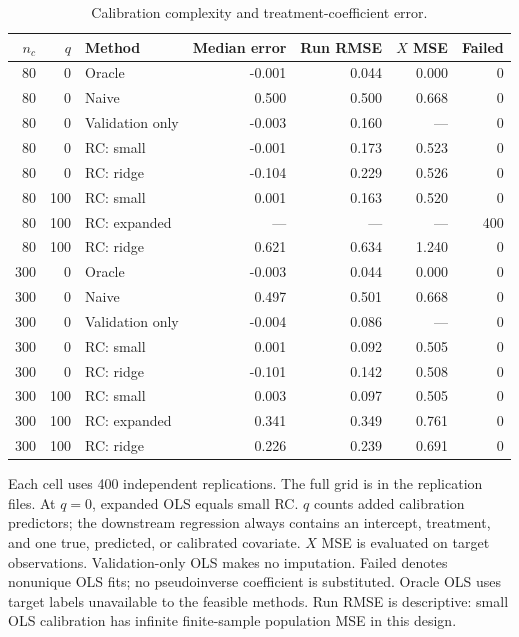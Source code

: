 \begin{table}[htbp]\centering\small
\caption{Calibration complexity and treatment-coefficient error.}
\label{tab:dimension}
\begin{tabular}{rrlrrrr}\toprule
$n_c$ & $q$ & Method & Median error & Run RMSE & $X$ MSE & Failed \\\midrule
80 & 0 & Oracle & -0.001 & 0.044 & 0.000 & 0 \\
80 & 0 & Naive & 0.500 & 0.500 & 0.668 & 0 \\
80 & 0 & Validation only & -0.003 & 0.160 & --- & 0 \\
80 & 0 & RC: small & -0.001 & 0.173 & 0.523 & 0 \\
80 & 0 & RC: ridge & -0.104 & 0.229 & 0.526 & 0 \\
80 & 100 & RC: small & 0.001 & 0.163 & 0.520 & 0 \\
80 & 100 & RC: expanded & --- & --- & --- & 400 \\
80 & 100 & RC: ridge & 0.621 & 0.634 & 1.240 & 0 \\
300 & 0 & Oracle & -0.003 & 0.044 & 0.000 & 0 \\
300 & 0 & Naive & 0.497 & 0.501 & 0.668 & 0 \\
300 & 0 & Validation only & -0.004 & 0.086 & --- & 0 \\
300 & 0 & RC: small & 0.001 & 0.092 & 0.505 & 0 \\
300 & 0 & RC: ridge & -0.101 & 0.142 & 0.508 & 0 \\
300 & 100 & RC: small & 0.003 & 0.097 & 0.505 & 0 \\
300 & 100 & RC: expanded & 0.341 & 0.349 & 0.761 & 0 \\
300 & 100 & RC: ridge & 0.226 & 0.239 & 0.691 & 0 \\
\bottomrule\end{tabular}
\par\smallskip\begin{minipage}{0.96\textwidth}\footnotesize
Each cell uses 400 independent replications. The full grid is in the replication files. At $q=0$, expanded OLS equals small RC. $q$ counts added calibration predictors; the downstream regression always contains an intercept, treatment, and one true, predicted, or calibrated covariate. $X$ MSE is evaluated on target observations. Validation-only OLS makes no imputation. Failed denotes nonunique OLS fits; no pseudoinverse coefficient is substituted. Oracle OLS uses target labels unavailable to the feasible methods. Run RMSE is descriptive: small OLS calibration has infinite finite-sample population MSE in this design.
\end{minipage}\end{table}
